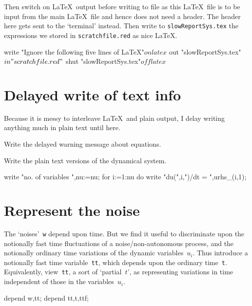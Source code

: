 \documentclass[11pt,a5paper]{article}
\begin{document}
Then switch on \LaTeX\ output before writing to file as this
\LaTeX\ file is to be input from the main \LaTeX\ file and
hence does not need a header. The header here gets sent to
the `terminal' instead. Then write to
\verb|slowReportSys.tex| the expressions we stored in
\verb|scratchfile.red| as nice \LaTeX.
\begin{reduce}
write "Ignore the following five lines of LaTeX"$
on latex$
out "slowReportSys.tex"$
in "scratchfile.red"$
shut "slowReportSys.tex"$
off latex$
\end{reduce}



\section{Delayed write of text info}
\label{sec:dwti}

Because it is messy to interleave \LaTeX\ and plain output,
I delay writing anything much in plain text until here.

Write the delayed warning message about equations.

Write the plain text versions of the dynamical system.
\begin{reduce}
write "no. of variables ",nu:=nu;
for i:=1:nu do write "du(",i,")/dt = ",urhs_(i,1);
\end{reduce}



\section{Represent the noise}

The `noises'~\verb|w| depend upon time. But we find it
useful to discriminate upon the notionally fast time
fluctuations of a noise/non-autonomous process, and the
notionally ordinary time variations of the dynamic
variables~$u_i$. Thus introduce a notionally fast time
variable~\verb|tt|, which depends upon the ordinary
time~\verb|t|. Equivalently, view~\verb|tt|, a sort of
`partial~$t$', as representing variations in time
independent of those in the variables~$u_i$.
\begin{reduce}
depend w,tt;
depend tt,t,ttf;
\end{reduce}
\end{document}
